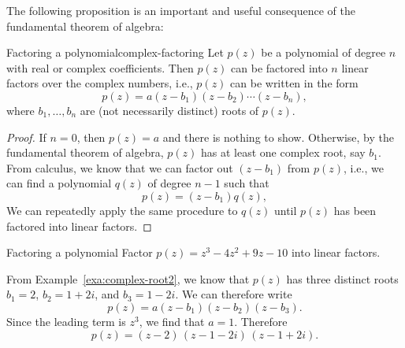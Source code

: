 The following proposition is an important and useful consequence of
the fundamental theorem of algebra:

\begin{proposition}{Factoring a polynomial}{complex-factoring}
  Let $p(z)$ be a polynomial of degree $n$ with real or complex
  coefficients. Then $p(z)$ can be factored into $n$ linear factors
  over the complex numbers, i.e., $p(z)$ can be written in the form
  \begin{equation*}
    p(z) = a(z-b_1)(z-b_2)\cdots(z-b_n),
  \end{equation*}
  where $b_1,\ldots,b_n$ are (not necessarily distinct) roots of
  $p(z)$.
\end{proposition}

\begin{proof}
  If $n=0$, then $p(z)=a$ and there is nothing to show. Otherwise, by
  the fundamental theorem of algebra, $p(z)$ has at least one complex
  root, say $b_1$. From calculus, we know that we can factor out
  $(z-b_1)$ from $p(z)$, i.e., we can find a polynomial $q(z)$ of
  degree $n-1$ such that 
  \begin{equation*}
    p(z) = (z-b_1) q(z),
  \end{equation*}
  We can repeatedly apply the same procedure to $q(z)$ until $p(z)$
  has been factored into linear factors.
\end{proof}

\begin{example}{Factoring a polynomial}
  Factor $p(z) = z^3 - 4z^2 + 9z - 10$ into linear factors.
\end{example}

\begin{solution}
  From Example~\ref{exa:complex-root2}, we know that $p(z)$ has three
  distinct roots $b_1=2$, $b_2=1+2i$, and $b_3=1-2i$. We can therefore
  write
  \begin{equation*}
    p(z) = a(z-b_1)(z-b_2)(z-b_3).
  \end{equation*}
  Since the leading term is $z^3$, we find that $a=1$. Therefore
  \begin{equation*}
    p(z) = (z-2)\,(z-1-2i)\,(z-1+2i).
  \end{equation*}
  \vspace{-2ex}
\end{solution}
